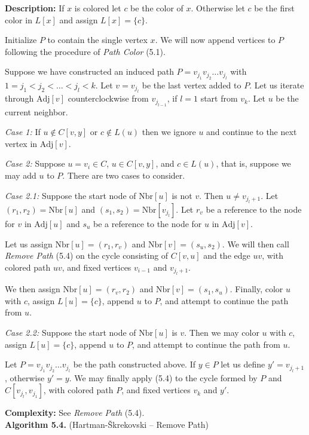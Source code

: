 \documentclass[letterpaper, 12pt]{article}
\theoremstyle{thm}
\begin{document}
\noindent\textbf{Description:} If $x$ is colored let $c$ be the color of $x$.
Otherwise let $c$ be the first color in $L[x]$ and assign
$L[x]=\{c\}$.

Initialize $P$ to contain the single vertex $x$. We will now
append vertices to $P$ following the procedure of \textit{Path Color} (5.1).

Suppose we have constructed an induced path $P=v_{j_1}v_{j_2}\ldots v_{j_l}$
with $1=j_1<j_2<\ldots<j_l< k$. Let $v=v_{j_l}$ be the last vertex added to $P$.
Let us iterate through $\text{Adj}[v]$ counterclockwise from $v_{j_{l-1}}$, if
$l=1$ start from $v_k$. Let $u$ be the current neighbor.

\textit{Case 1:} If $u\not\in C[v,y]$ or $c\not\in L(u)$ then we ignore $u$ and
continue to the next vertex in $\text{Adj}[v]$.

\textit{Case 2:} Suppose $u=v_i\in C$,
$u\in C[v,y]$, and $c\in L(u)$, that is, suppose we may add $u$ to $P$.
There are two cases to consider.

\textit{Case 2.1:} Suppose the start node of $\text{Nbr}[u]$ is not $v$. Then
$u\ne v_{j_l +1}$. Let $(r_1,r_2)=\text{Nbr}[u]$ and
$(s_1,s_2)=\text{Nbr}[v_{j_l}]$. Let $r_v$ be a reference to the node for
$v$ in $\text{Adj}[u]$ and $s_u$ be a reference to the node for $u$ in
$\text{Adj}[v]$.

Let us assign $\text{Nbr}[u]=(r_1,r_v)$ and $\text{Nbr}[v]=(s_u,s_2)$. We will
then call \textit{Remove Path} (5.4) on the cycle consisting of $C[v,u]$ and the
edge $uv$, with colored path $uv$, and fixed vertices $v_{i-1}$ and
$v_{j_l+1}$.

We then assign $\text{Nbr}[u]=(r_v,r_2)$ and $\text{Nbr}[v]=(s_1,s_u)$. Finally,
color $u$ with $c$, assign $L[u]=\{c\}$, append $u$ to $P$, and attempt to
continue the path from $u$.

\textit{Case 2.2:} Suppose the start node of $\text{Nbr}[u]$ is $v$. Then we may
color $u$ with $c$, assign $L[u]=\{c\}$, append $u$ to $P$, and attempt to
continue the path from $u$.

Let $P=v_{j_1}v_{j_2}\ldots v_{j_l}$ be the path constructed above.
If $y\in P$ let us define $y'=v_{j_l+1}$, otherwise $y'=y$.
We may finally apply  (5.4) to the cycle formed by $P$ and
$C[v_{j_l},v_{j_1}]$, with colored path $P$, and fixed
vertices $v_k$ and $y'$.

\noindent\textbf{Complexity:} See \textit{Remove Path} (5.4).\\

\noindent\textbf{Algorithm 5.4.} (Hartman-\v{S}krekovski -- Remove Path)
\end{document}
